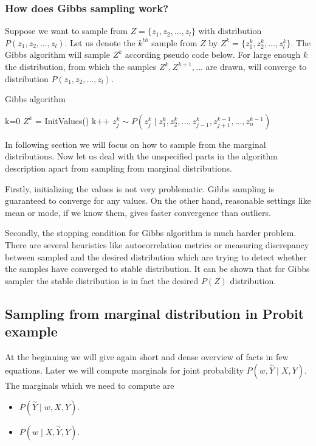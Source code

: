 \subsubsection*{How does Gibbs sampling work?}
Suppose we want to sample from $Z = \{z_1, z_2, \ldots, z_l\}$ with distribution $P(z_1, z_2, \ldots, z_l)$. Let us denote the $k^{th}$ sample from $Z$ by $Z^k = \{z_1^k, z_2^k, \ldots, z_l^k\}$. The Gibbs algorithm will sample $Z^k$ according pseudo code below. For large enough $k$ the distribution, from which the samples $Z^k, Z^{k+1}, \ldots $ are drawn, will converge to distribution $P(z_1, z_2, \ldots, z_l)$. 


\begin{algorithm}
\caption{Gibbs algorithm} \label{gibbs_pseudo}
\begin{algorithmic}
\State k=0
\State $Z^k$ = InitValues()
    \State  k++
        \State $z_j^k \sim P(z_j^k  \mid z_1^k,z_2^k, \ldots, z_{j-1}^k, z_{j+1}^{k-1}, \ldots, z_{n}^{k-1})$
    \EndFor
\EndWhile
\end{algorithmic}
\end{algorithm}

In following section we will focus on how to sample from the marginal distributions. Now let us deal with the unspecified parts in the algorithm description apart from sampling from marginal distributions.

Firstly, initializing the values is not very problematic. Gibbs sampling is guaranteed to converge for any values. On the other hand, reasonable settings like mean or mode, if we know them,  gives faster convergence than outliers. \cite{gibbs_intro}

Secondly, the stopping condition for Gibbs algorithm is much harder problem. There are several heuristics like autocorrelation metrics or measuring discrepancy between sampled and the desired distribution which are trying to detect whether the samples have converged to stable distribution. It can be shown that for Gibbs sampler the stable distribution is in fact the desired $P(Z)$ distribution. \cite{explaining_gibbs}


\subsection{Sampling from marginal distribution in Probit example} 
\label{ssec:sampling_from_marginal_distribution_in_probit_example}
At the beginning we will give again short and dense overview of facts in few equations. Later we will compute marginals for joint probability $P(w, \overset{\sim}{Y} \mid X, Y)$. The marginals which we need to compute are 
\begin{itemize}
    \item $P(\overset{\sim}{Y} \mid w, X, Y)$.
    \item $P(w \mid X, \overset{\sim}{Y}, Y)$.
\end{itemize}

